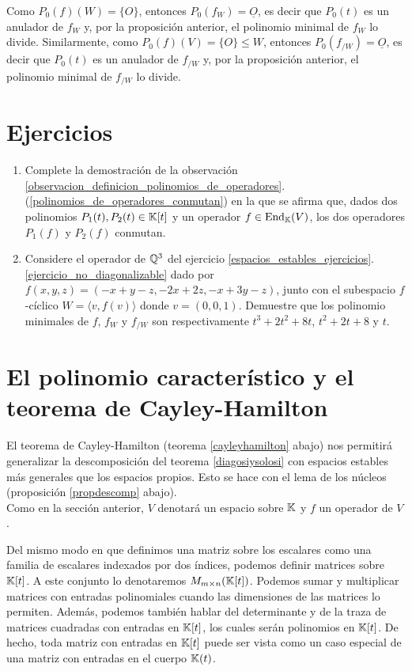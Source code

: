   \dem Como $P_0(f)(W)=\{O\}$, entonces $P_0(f_W)=\underline{O}$, es decir que $P_0(t)$ es un anulador de $f_W$ y, por la proposición anterior, el polinomio minimal de $f_W$ lo divide. Similarmente, como $P_0(f)(V)=\{O\}\le W$, entonces $P_0(f_{/W})=\underline{O}$, es decir que $P_0(t)$ es un anulador de $f_{/W}$ y, por la proposición anterior, el polinomio minimal de $f_{/W}$ lo divide.

\section*{Ejercicios}

\begin{enumerate}
  \item Complete la demostración de la observación \ref{observacion_definicion_polinomios_de_operadores}.(\ref{polinomios_de_operadores_conmutan}) en la que se afirma que, dados dos polinomios $P_1(t),P_2(t)\in \mathbb{K}[t]$ y un operador $f\in\operatorname{End}_{\mathbb{K}}(V)$, los dos operadores $P_1(f)$ y $P_2(f)$ conmutan.
  \item Considere el operador de $\mathbb{Q}^3$ del ejercicio \ref{espacios_estables_ejercicios}.\ref{ejercicio_no_diagonalizable} dado por $f(x,y,z)=(-x+y-z,-2x+2z,-x+3y-z)$, junto con el subespacio $f$-cíclico $W=\langle v, f(v)\rangle$ donde $v=(0,0,1)$. Demuestre que los polinomio minimales de $f$, $f_W$ y $f_{/W}$ son respectivamente $t^3+2t^2+8t$, $t^2+2t+8$ y $t$.
\end{enumerate}

\section{El polinomio característico y el teorema de Cayley-Hamilton}

El teorema de Cayley-Hamilton (teorema \ref{cayleyhamilton} abajo) nos permitirá generalizar la descomposición del teorema \ref{diagosiysolosi} con espacios estables más generales que los espacios propios. Esto se hace con el lema de los núcleos (proposición \ref{propdescomp} abajo).\\
Como en la sección anterior, $V$ denotará un espacio sobre $\mathbb{K}$ y $f$ un operador de $V$.

\begin{obs}
Del mismo modo en que definimos una matriz sobre los escalares como una familia de escalares indexados por dos índices, podemos definir matrices sobre $\mathbb{K}[t]$. A este conjunto lo denotaremos $M_{m\times n}(\mathbb{K}[t])$. Podemos sumar y multiplicar matrices con entradas polinomiales cuando las dimensiones de las matrices lo permiten. Además, podemos también hablar del determinante y de la traza de matrices cuadradas con entradas en $\mathbb{K}[t]$, los cuales ser\'an polinomios en $\mathbb{K}[t]$. De hecho, toda matriz con entradas en $\mathbb{K}[t]$ puede ser vista como un caso especial de una matriz con entradas en el cuerpo $\mathbb{K}(t)$.
\end{obs}

